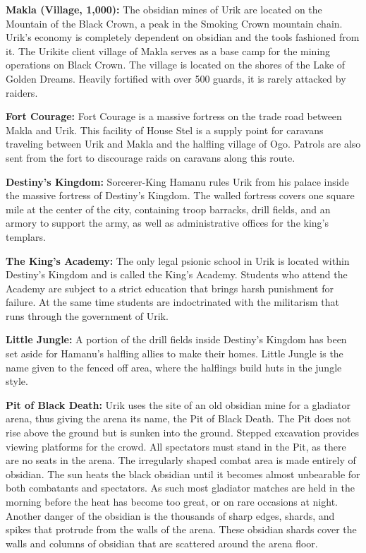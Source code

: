 {
	\textbf{Makla (Village, 1,000):} The obsidian mines of Urik are located on the Mountain of the Black Crown, a peak in the Smoking Crown mountain chain. Urik's economy is completely dependent on obsidian and the tools fashioned from it. The Urikite client village of Makla serves as a base camp for the mining operations on Black Crown. The village is located on the shores of the Lake of Golden Dreams. Heavily fortified with over 500 guards, it is rarely attacked by raiders.

	\textbf{Fort Courage:} Fort Courage is a massive fortress on the trade road between Makla and Urik. This facility of House Stel is a supply point for caravans traveling between Urik and Makla and the halfling village of Ogo. Patrols are also sent from the fort to discourage raids on caravans along this route.
}
{
	\textbf{Destiny's Kingdom:} Sorcerer-King Hamanu rules Urik from his palace inside the massive fortress of Destiny's Kingdom. The walled fortress covers one square mile at the center of the city, containing troop barracks, drill fields, and an armory to support the army, as well as administrative offices for the king's templars.

	\textbf{The King's Academy:} The only legal psionic school in Urik is located within Destiny's Kingdom and is called the King's Academy. Students who attend the Academy are subject to a strict education that brings harsh punishment for failure. At the same time students are indoctrinated with the militarism that runs through the government of Urik.

	\textbf{Little Jungle:} A portion of the drill fields inside Destiny's Kingdom has been set aside for Hamanu's halfling allies to make their homes. Little Jungle is the name given to the fenced off area, where the halflings build huts in the jungle style.

	\textbf{Pit of Black Death:} Urik uses the site of an old obsidian mine for a gladiator arena, thus giving the arena its name, the Pit of Black Death. The Pit does not rise above the ground but is sunken into the ground. Stepped excavation provides viewing platforms for the crowd. All spectators must stand in the Pit, as there are no seats in the arena. The irregularly shaped combat area is made entirely of obsidian. The sun heats the black obsidian until it becomes almost unbearable for both combatants and spectators. As such most gladiator matches are held in the morning before the heat has become too great, or on rare occasions at night. Another danger of the obsidian is the thousands of sharp edges, shards, and spikes that protrude from the walls of the arena. These obsidian shards cover the walls and columns of obsidian that are scattered around the arena floor.

}
